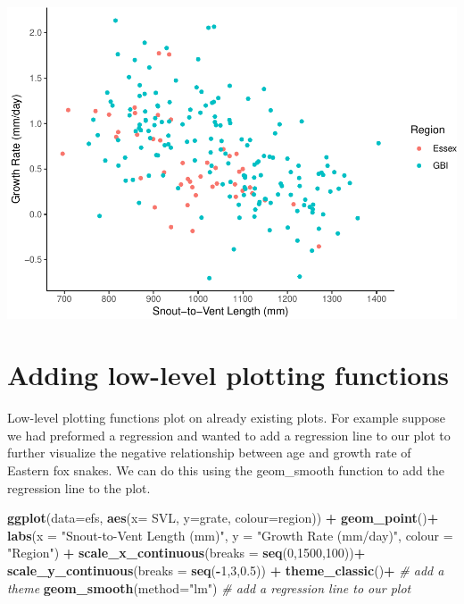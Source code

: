 \documentclass[
]{book}
\newenvironment{Shaded}{\begin{snugshade}}{\end{snugshade}}
\newcommand{\AttributeTok}[1]{\textcolor[rgb]{0.13,0.29,0.53}{#1}}
\newcommand{\CommentTok}[1]{\textcolor[rgb]{0.56,0.35,0.01}{\textit{#1}}}
\newcommand{\DecValTok}[1]{\textcolor[rgb]{0.00,0.00,0.81}{#1}}
\newcommand{\FloatTok}[1]{\textcolor[rgb]{0.00,0.00,0.81}{#1}}
\newcommand{\FunctionTok}[1]{\textcolor[rgb]{0.13,0.29,0.53}{\textbf{#1}}}
\newcommand{\NormalTok}[1]{#1}
\newcommand{\SpecialCharTok}[1]{\textcolor[rgb]{0.81,0.36,0.00}{\textbf{#1}}}
\newcommand{\StringTok}[1]{\textcolor[rgb]{0.31,0.60,0.02}{#1}}
\begin{document}
\includegraphics{series_files/figure-latex/unnamed-chunk-26-1.pdf}

\hypertarget{adding-low-level-plotting-functions}{%
\section{Adding low-level plotting functions}\label{adding-low-level-plotting-functions}}

Low-level plotting functions plot on already existing plots. For example suppose we had preformed a regression and wanted to add a regression line to our plot to further visualize the negative relationship between age and growth rate of Eastern fox snakes. We can do this using the geom\_smooth function to add the regression line to the plot.

\begin{Shaded}
\begin{Highlighting}[]
\FunctionTok{ggplot}\NormalTok{(}\AttributeTok{data=}\NormalTok{efs, }\FunctionTok{aes}\NormalTok{(}\AttributeTok{x=}\NormalTok{ SVL, }\AttributeTok{y=}\NormalTok{grate, }\AttributeTok{colour=}\NormalTok{region)) }\SpecialCharTok{+}      
        \FunctionTok{geom\_point}\NormalTok{()}\SpecialCharTok{+}   
        \FunctionTok{labs}\NormalTok{(}\AttributeTok{x =} \StringTok{"Snout{-}to{-}Vent Length (mm)"}\NormalTok{,        }
            \AttributeTok{y =} \StringTok{"Growth Rate (mm/day)"}\NormalTok{,}
            \AttributeTok{colour =} \StringTok{"Region"}\NormalTok{) }\SpecialCharTok{+}   
        \FunctionTok{scale\_x\_continuous}\NormalTok{(}\AttributeTok{breaks =} \FunctionTok{seq}\NormalTok{(}\DecValTok{0}\NormalTok{,}\DecValTok{1500}\NormalTok{,}\DecValTok{100}\NormalTok{))}\SpecialCharTok{+}
        \FunctionTok{scale\_y\_continuous}\NormalTok{(}\AttributeTok{breaks =} \FunctionTok{seq}\NormalTok{(}\SpecialCharTok{{-}}\DecValTok{1}\NormalTok{,}\DecValTok{3}\NormalTok{,}\FloatTok{0.5}\NormalTok{)) }\SpecialCharTok{+}   
        \FunctionTok{theme\_classic}\NormalTok{()}\SpecialCharTok{+}  \CommentTok{\# add a theme}
        \FunctionTok{geom\_smooth}\NormalTok{(}\AttributeTok{method=}\StringTok{"lm"}\NormalTok{)  }\CommentTok{\# add a regression line to our plot}
\end{Highlighting}
\end{Shaded}
\end{document}
